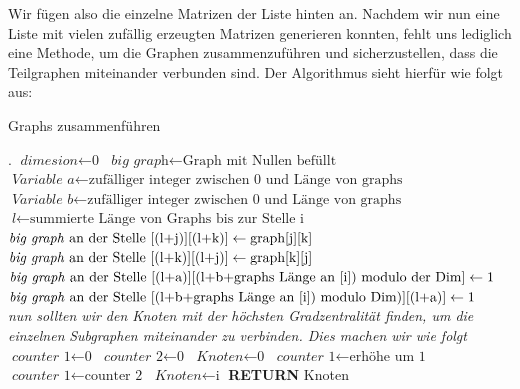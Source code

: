 \newpage
Wir fügen also die einzelne Matrizen der Liste hinten an.
Nachdem wir nun eine Liste mit vielen zufällig erzeugten Matrizen generieren konnten, fehlt uns lediglich eine Methode, um die Graphen zusammenzuführen und sicherzustellen, dass die Teilgraphen miteinander verbunden sind. Der Algorithmus sieht hierfür wie folgt aus:

\begin{algorithm}
\caption{Graphs zusammenführen}\label{uniteGraphs}
\begin{algorithmic}[1]
\State {}.
\EndIf
\State $\textit{dimesion} \gets \text{0}$
\State $\textit{big graph} \gets \text{Graph mit Nullen befüllt}$
\State $\textit{Variable a} \gets \text{zufälliger integer zwischen 0 und Länge von graphs}$
\State $\textit{Variable b} \gets \text{zufälliger integer zwischen 0 und Länge von graphs}$
\State $\textit{l} \gets \text{summierte Länge von Graphs bis zur Stelle i}$
\State $\text{\textit{big graph} an der Stelle [(l+j)][(l+k)]} \gets \text{graph[j][k]}$
\State $\text{\textit{big graph} an der Stelle [(l+k)][(l+j)]} \gets \text{graph[k][j]}$
\State $\text{\textit{big graph} an der Stelle [(l+a)][(l+b+graphs Länge an [i]) modulo der Dim]} \gets \text{1}$
\State $\text{\textit{big graph} an der Stelle [(l+b+graphs Länge an [i]) modulo Dim)][(l+a)]} \gets \text{1}$
\EndFor
\EndFor
\\
\textit{nun sollten wir den Knoten mit der höchsten Gradzentralität finden, um die einzelnen}
\textit{Subgraphen miteinander zu verbinden. Dies machen wir wie folgt}\\
\State $\textit{counter 1} \gets \text{0}$
\State $\textit{counter 2} \gets \text{0}$
\State $\textit{Knoten} \gets \text{0}$
\State $\textit{counter 1} \gets \text{erhöhe um 1}$
\State $\textit{counter 1} \gets \text{counter 2}$
\State $\textit{Knoten} \gets \text{i}$
\EndIf
\EndIf
\EndFor
\textbf{RETURN} Knoten 
\EndProcedure
\end{algorithmic}
\end{algorithm}

